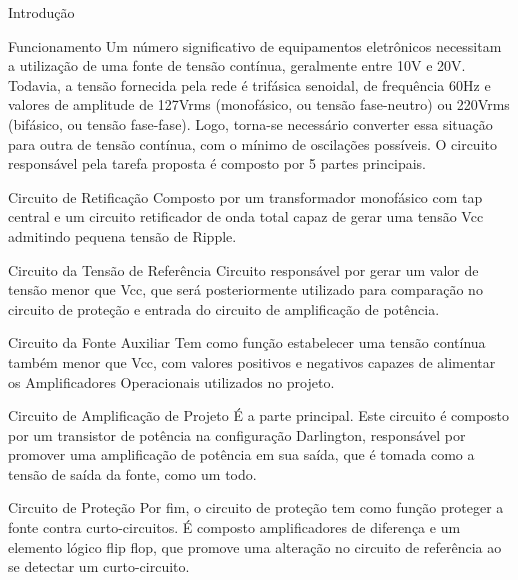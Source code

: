 Introdução

Funcionamento
Um número significativo de equipamentos eletrônicos necessitam a utilização de uma fonte de tensão contínua, geralmente entre 10V e 20V. Todavia, a tensão fornecida pela rede é trifásica senoidal, de frequência 60Hz e valores de amplitude de 127Vrms (monofásico, ou tensão fase-neutro) ou 220Vrms (bifásico, ou tensão fase-fase). Logo, torna-se necessário converter essa situação para outra de tensão contínua, com o mínimo de oscilações possíveis. 
O circuito responsável pela tarefa proposta é composto por 5 partes principais.

Circuito de Retificação
Composto por um transformador monofásico com tap central e um circuito retificador de onda total capaz de gerar uma tensão Vcc admitindo pequena tensão de Ripple.

Circuito da Tensão de Referência
Circuito responsável por gerar um valor de tensão menor que Vcc, que será posteriormente utilizado para comparação no circuito de proteção e entrada do circuito de amplificação de potência.

Circuito da Fonte Auxiliar
Tem como função estabelecer uma tensão contínua também menor que Vcc, com valores positivos e negativos capazes de alimentar os Amplificadores Operacionais utilizados no projeto.

Circuito de Amplificação de Projeto
É a parte principal. Este circuito é composto por um transistor de potência na configuração Darlington, responsável por promover uma amplificação de potência em sua saída, que é tomada como a tensão de saída da fonte, como um todo.

Circuito de Proteção
Por fim, o circuito de proteção tem como função proteger a fonte contra curto-circuitos. É composto amplificadores de diferença e um elemento lógico flip flop, que promove uma alteração no circuito de referência ao se detectar um curto-circuito.